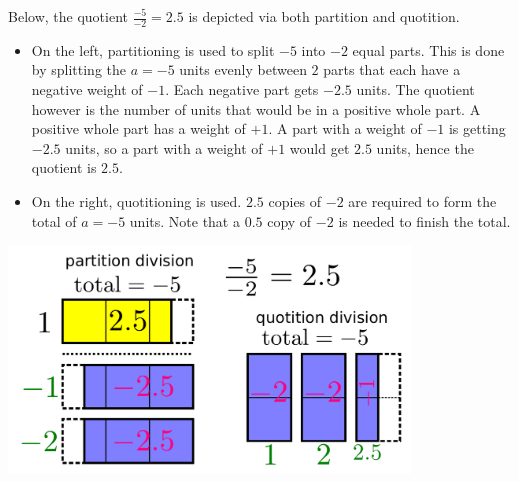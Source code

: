 \documentclass{article}
\begin{document}
Below, the quotient \(\frac{-5}{-2} = 2.5\) is depicted via both partition and quotition. 
\begin{itemize}
\item On the left, partitioning is used to split \(-5\) into \(-2\) equal parts. This is done by splitting the \(a = -5\) units evenly between \(2\) parts that each have a negative weight of \(-1\). Each negative part gets \(-2.5\) units. The quotient however is the number of units that would be in a positive whole part. A positive whole part has a weight of \(+1\). A part with a weight of \(-1\) is getting \(-2.5\) units, so a part with a weight of \(+1\) would get \(2.5\) units, hence the quotient is \(2.5\).
\item On the right, quotitioning is used. \(2.5\) copies of \(-2\) are required to form the total of \(a = -5\) units. Note that a \(0.5\) copy of \(-2\) is needed to finish the total. 
\end{itemize}
\includegraphics[width = 0.8\textwidth]{m5_div_m2}

\vspace{5mm}
\end{document}
